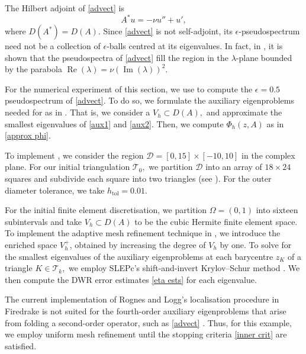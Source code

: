 The Hilbert adjoint of \eqref{advect} is 
\begin{equation}
    A^*u = - \nu u'' + u',
\end{equation}
where $D(A^*) = D(A).$ Since \eqref{advect} is not self-adjoint,  its $\epsilon$-pseudospectrum need not be a collection of $\epsilon$-balls centred at its eigenvalues. In fact, in \cite[Section 3.12]{Nick}, it is shown that the pseudospectra of \eqref{advect} fill the region in the $\lambda$-plane bounded by the parabola $\operatorname{Re}(\lambda) = \nu (\operatorname{Im}(\lambda))^2.$ 

For the numerical experiment of this section, we use  to compute the $\epsilon =0.5$ pseudospectrum of \eqref{advect}. To do so, we formulate the auxiliary eigenproblems needed for  as in . That is, we consider a $V_h \subset D(A), $ and approximate the smallest eigenvalues of \eqref{aux1} and \eqref{aux2}. Then, we compute $\Phi_h(z, A)$ as in \eqref{approx phi}.

To implement , we consider the region $\mathcal{D} = [0, 15] \times [-10, 10]$ in the complex plane. For our initial triangulation $\mathcal{T}_0,$ we partition $\mathcal{D}$ into an array of $18 \times 24$ squares and subdivide each square into two triangles (see ). For the outer diameter tolerance, we take $h_{\text{tol}} = 0.01.$

For the initial finite element discretisation, we partition $\Omega = (0, 1)$ into sixteen subintervals and take $V_h \subset D(A)$ to be the cubic Hermite finite element space. To implement the adaptive mesh refinement technique in , we introduce the enriched space $V_h^+$, obtained by increasing the degree of $V_h$ by one. To solve for the smallest eigenvalues of the auxiliary eigenproblems at each barycentre $z_K$ of a triangle $K \in \mathcal{T}_k,$ we employ SLEPc's shift-and-invert Krylov--Schur method \cite{krylov,slep}. We then compute the DWR error estimates \eqref{eta ests} for each eigenvalue. 

 The current implementation of Rognes and Logg's localisation procedure in Firedrake is not suited for the fourth-order auxiliary eigenproblems that arise from folding a second-order operator, such as \eqref{advect} \cite{logg}. Thus, for this example, we employ uniform mesh refinement until the stopping criteria \eqref{inner crit} are satisfied. 

 
